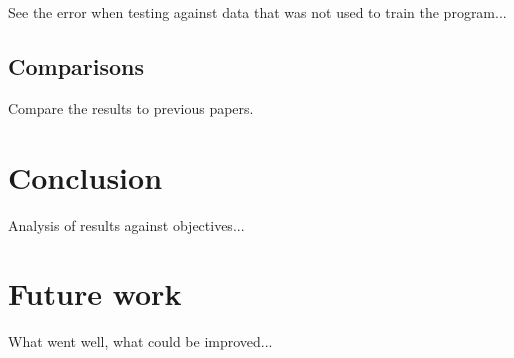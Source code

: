\documentclass{article}
\theoremstyle{definition}
\begin{document}
See the error when testing against data that was not used to train the program...

\subsection{Comparisons}

Compare the results to previous papers.

\section{Conclusion}

Analysis of results against objectives...

\section{Future work}

What went well, what could be improved...



\end{document}
